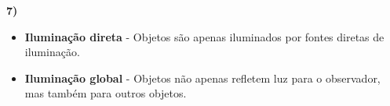 \textbf{7)} 

\begin{itemize}
	\item \textbf{Iluminação direta} - Objetos são apenas iluminados por fontes 
	diretas de iluminação.
	\item \textbf{Iluminação global} - Objetos não apenas refletem luz para o observador,
	mas também para outros objetos.
\end{itemize}
